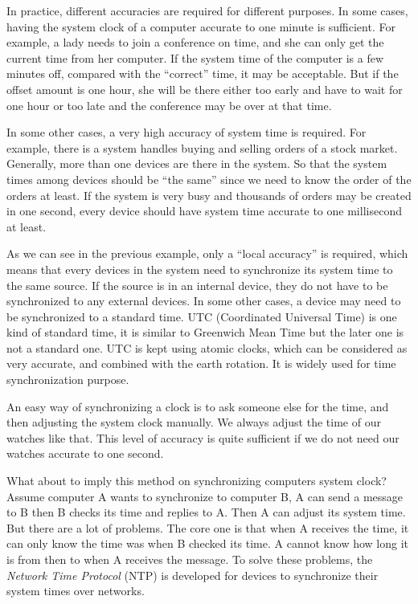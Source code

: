 In practice, different accuracies are required for different purposes. 
In some cases, having the system clock of a computer accurate to one
minute is sufficient. For example, a lady needs to join a conference on time,
and she can only get the current time from her computer. If the system time
of the computer is a few minutes off, compared with the ``correct'' time, it
may be acceptable. But if the offset amount is one hour, she will be there
either too early and have to wait for one hour or too late and the conference
may be over at that time.

In some other cases, a very high accuracy of system time is required. For
example, there is a system handles buying and selling orders of a stock market.
Generally, more than one devices are there in the system. So that the system
times among devices should be ``the same'' since we need to know the order of
the orders at least. If the system is very busy and thousands of orders may be
created in one second, every device should have system time accurate to
one millisecond at least.

As we can see in the previous example, only a ``local accuracy'' is required,
which means that every devices in the system need to synchronize its system
time to the same source. If the source is in an internal device, they do not
have to be synchronized to any external devices. In some other cases, a device
may need to be synchronized to a standard time. 
UTC (Coordinated Universal Time) is one kind of standard time, it is similar 
to Greenwich Mean Time but the later one is not a standard one. UTC is kept
using atomic clocks, which can be considered as very accurate, and combined
with the earth rotation. It is widely used for time synchronization purpose.

An easy way of synchronizing a clock is to ask someone else for the time, and
then adjusting the system clock manually. We always adjust the time of our
watches like that. This level of accuracy is quite sufficient if we do not need
our watches accurate to one second. 

What about to imply this method on synchronizing computers system clock? Assume
computer A wants to synchronize to computer B, A can send a message to B then B
checks its time and replies to A\null. Then A can adjust its system time.  
But there are a lot of problems.  The core one is that when A receives
the time, it can only know the time was when B checked its time. A cannot know
how long it is from then to when A receives the message. To solve these
problems, the \emph{Network Time Protocol} (NTP) is developed for devices to
synchronize their system times over networks. 

